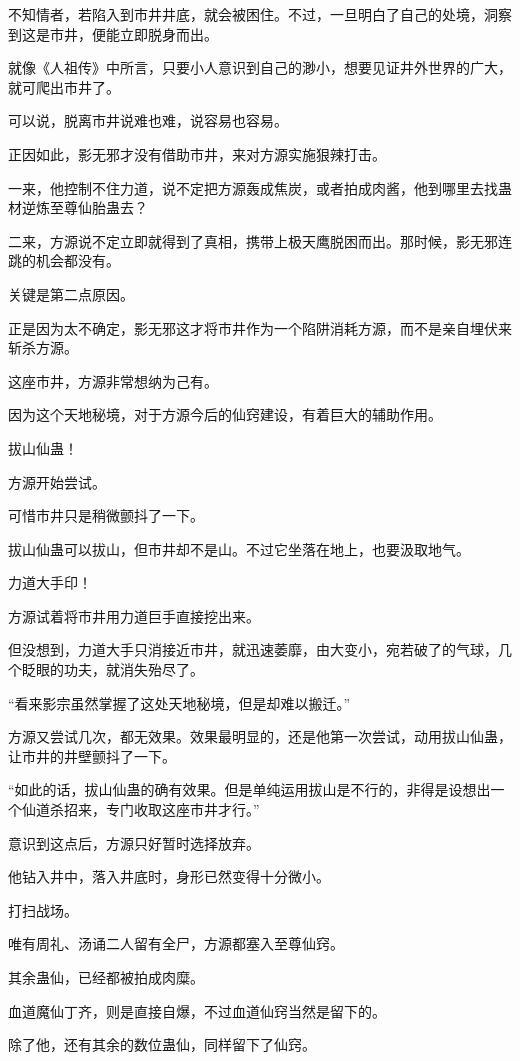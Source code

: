 \begin{this_body}
不知情者，若陷入到市井井底，就会被困住。不过，一旦明白了自己的处境，洞察到这是市井，便能立即脱身而出。

就像《人祖传》中所言，只要小人意识到自己的渺小，想要见证井外世界的广大，就可爬出市井了。

可以说，脱离市井说难也难，说容易也容易。

正因如此，影无邪才没有借助市井，来对方源实施狠辣打击。

一来，他控制不住力道，说不定把方源轰成焦炭，或者拍成肉酱，他到哪里去找蛊材逆炼至尊仙胎蛊去？

二来，方源说不定立即就得到了真相，携带上极天鹰脱困而出。那时候，影无邪连跳的机会都没有。

关键是第二点原因。

正是因为太不确定，影无邪这才将市井作为一个陷阱消耗方源，而不是亲自埋伏来斩杀方源。

这座市井，方源非常想纳为己有。

因为这个天地秘境，对于方源今后的仙窍建设，有着巨大的辅助作用。

拔山仙蛊！

方源开始尝试。

可惜市井只是稍微颤抖了一下。

拔山仙蛊可以拔山，但市井却不是山。不过它坐落在地上，也要汲取地气。

力道大手印！

方源试着将市井用力道巨手直接挖出来。

但没想到，力道大手只消接近市井，就迅速萎靡，由大变小，宛若破了的气球，几个眨眼的功夫，就消失殆尽了。

“看来影宗虽然掌握了这处天地秘境，但是却难以搬迁。”

方源又尝试几次，都无效果。效果最明显的，还是他第一次尝试，动用拔山仙蛊，让市井的井壁颤抖了一下。

“如此的话，拔山仙蛊的确有效果。但是单纯运用拔山是不行的，非得是设想出一个仙道杀招来，专门收取这座市井才行。”

意识到这点后，方源只好暂时选择放弃。

他钻入井中，落入井底时，身形已然变得十分微小。

打扫战场。

唯有周礼、汤诵二人留有全尸，方源都塞入至尊仙窍。

其余蛊仙，已经都被拍成肉糜。

血道魔仙丁齐，则是直接自爆，不过血道仙窍当然是留下的。

除了他，还有其余的数位蛊仙，同样留下了仙窍。


\end{this_body}
